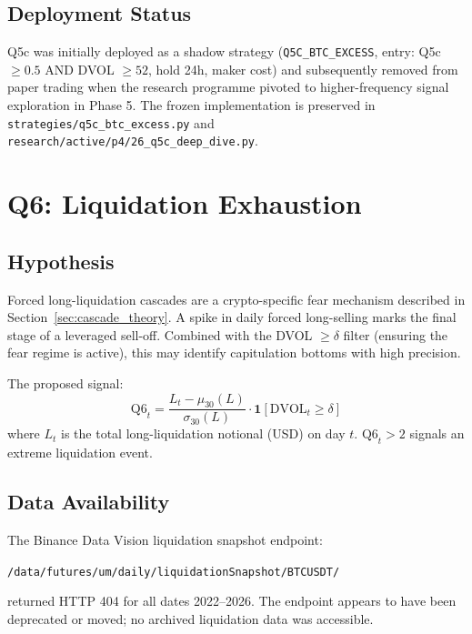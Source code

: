 \documentclass[12pt, a4paper]{article}
\theoremstyle{plain}
\theoremstyle{definition}
\newcommand{\DVOL}{\mathrm{DVOL}}
\begin{document}
\subsection{Deployment Status}

Q5c was initially deployed as a shadow strategy (\texttt{Q5C\_BTC\_EXCESS},
entry: Q5c $\geq 0.5$ AND DVOL $\geq 52$, hold 24h, maker cost) and
subsequently removed from paper trading when the research programme pivoted
to higher-frequency signal exploration in Phase 5.  The frozen
implementation is preserved in \texttt{strategies/q5c\_btc\_excess.py}
and \texttt{research/active/p4/26\_q5c\_deep\_dive.py}.

\section{Q6: Liquidation Exhaustion}
\label{sec:q6}

\subsection{Hypothesis}

Forced long-liquidation cascades are a crypto-specific fear mechanism
described in Section~\ref{sec:cascade_theory}.  A spike in daily forced
long-selling marks the final stage of a leveraged sell-off.  Combined
with the DVOL $\geq \delta$ filter (ensuring the fear regime is active),
this may identify capitulation bottoms with high precision.

The proposed signal:
\begin{equation}
  \text{Q6}_t = \frac{L_t - \mu_{30}(L)}{\sigma_{30}(L)} \cdot
                \mathbf{1}[\DVOL_t \geq \delta]
\end{equation}
where $L_t$ is the total long-liquidation notional (USD) on day $t$.
$\text{Q6}_t > 2$ signals an extreme liquidation event.

\subsection{Data Availability}

The Binance Data Vision liquidation snapshot endpoint:
\begin{center}
\texttt{/data/futures/um/daily/liquidationSnapshot/BTCUSDT/}
\end{center}
returned HTTP 404 for all dates 2022--2026.  The endpoint appears to
have been deprecated or moved; no archived liquidation data was
accessible.
\end{document}
